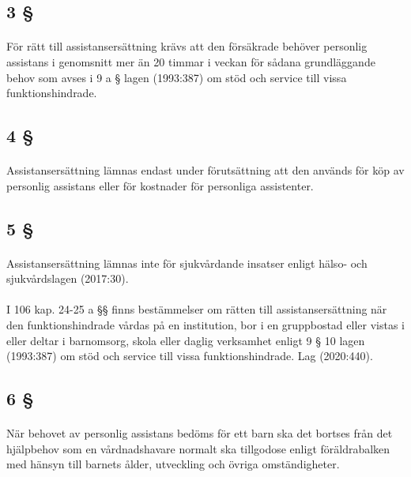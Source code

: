 \documentclass[a4paper,notitlepage,openany,10pt]{book}
\begin{document}
\subsection*{3 §}
\paragraph*{}
För rätt till assistansersättning krävs att den försäkrade behöver personlig assistans i genomsnitt mer än 20 timmar i veckan för sådana grundläggande behov som avses i 9 a § lagen (1993:387) om stöd och service till vissa funktionshindrade.
\subsection*{4 §}
\paragraph*{}
Assistansersättning lämnas endast under förutsättning att den används för köp av personlig assistans eller för kostnader för personliga assistenter.
\subsection*{5 §}
\paragraph*{}
Assistansersättning lämnas inte för sjukvårdande insatser enligt hälso- och sjukvårdslagen (2017:30).
\paragraph*{}
I 106 kap. 24-25 a §§ finns bestämmelser om rätten till assistansersättning när den funktionshindrade vårdas på en institution, bor i en gruppbostad eller vistas i eller deltar i barnomsorg, skola eller daglig verksamhet enligt 9 § 10 lagen (1993:387) om stöd och service till vissa funktionshindrade.
Lag (2020:440).
\subsection*{6 §}
\paragraph*{}
När behovet av personlig assistans bedöms för ett barn ska det bortses från det hjälpbehov som en vårdnadshavare normalt ska tillgodose enligt föräldrabalken med hänsyn till barnets ålder, utveckling och övriga omständigheter.
\end{document}

